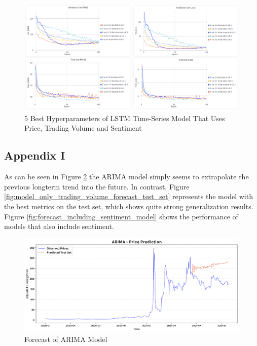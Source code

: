 \documentclass[11pt, a4paper]{article}
\begin{document}
\begin{figure}[!h]
    \centering
    \includegraphics[width=\textwidth]{All_Features.png}
    \caption{5 Best Hyperparameters of LSTM Time-Series Model That Uses Price, Trading Volume and Sentiment}
    \label{fig:lstmpricetradingvolumeandsentiment5best}
\end{figure}


\pagebreak
\subsection{Appendix I}
\label{appendix:Forecast}
As can be seen in Figure \ref{fig:arima_prediction_test_set} the ARIMA model simply seems to extrapolate the previous longterm trend into the future.
In contrast, Figure \ref{fig:model_only_trading_volume_forecast_test_set} represents the model with the best metrics on the test set, which shows quite strong generalization results.
Figure \ref{fig:forecast_including_sentiment_model} shows the performance of models that also include sentiment.

\begin{figure}[!htb]
    \centering
    \includegraphics[width=\textwidth]{prediction_arima_pred.png}
    \caption{Forecast of ARIMA Model}
    \label{fig:arima_prediction_test_set}
\end{figure}
\end{document}
